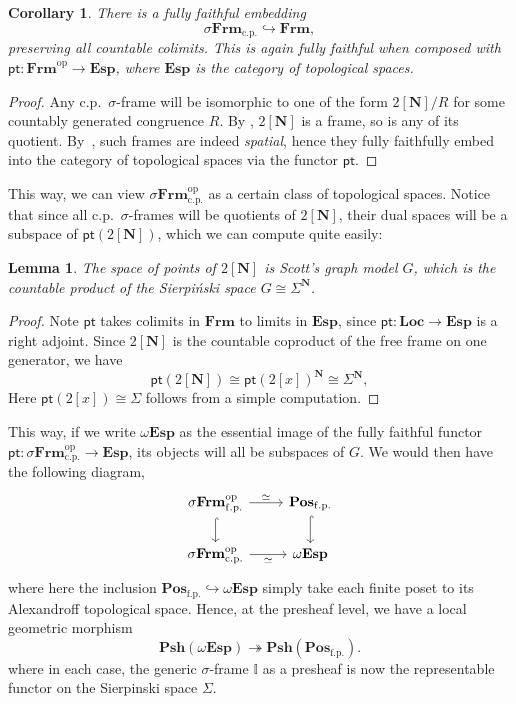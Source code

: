 \documentclass[a4paper,12pt]{amsart}
\newtheorem{lemma}[theorem]{Lemma}
\newtheorem{corollary}[theorem]{Corollary}
\theoremstyle{definition}
\newcommand{\mb}[1]{\mathbf{#1}}
\newcommand{\mbb}[1]{\mathbb{#1}}
\newcommand{\I}{\mbb I}
\newcommand{\mr}[1]{\mathrm{#1}}
\newcommand{\ms}[1]{\mathsf{#1}}
\newcommand{\Pos}{\mb{Pos}}
\newcommand{\psh}{\mb{Psh}}
\newcommand{\op}{^{\mathrm{op}}}
\newcommand{\surj}{\twoheadrightarrow}
\newcommand{\hook}{\hookrightarrow}
\newcommand{\fp}{_{\mr{f.p.}}}
\newcommand{\cp}{_{\mr{c.p.}}}
\newcommand{\N}{\mb N}
\newcommand{\pt}{\ms{pt}}
\newcommand{\sFrm}{\sigma\mb{Frm}}
\newcommand{\Frm}{\mb{Frm}}
\newcommand{\Loc}{\mb{Loc}}
\newcommand{\Topp}{\mb{Esp}}
\newcommand{\wTop}{\omega\mb{Esp}}
\begin{document}

\begin{corollary}\label{cor:dualsframe}
  There is a fully faithful embedding
  \[ \sFrm\cp \hook \Frm, \]
  preserving all countable colimits. This is again fully faithful when composed with $\ms{pt} : \Frm\op \to \Topp$, where $\Topp$ is the category of topological spaces.
\end{corollary}
\begin{proof}
  Any c.p.\ $\sigma$-frame will be isomorphic to one of the form $2[\N]/R$ for some countably generated congruence $R$. By , $2[\N]$ is a frame, so is any of its quotient. By~\cite[Thm. 6.2.4]{makkai2006first}, such frames are indeed \emph{spatial}, hence they fully faithfully embed into the category of topological spaces via the functor $\pt$.
\end{proof}

This way, we can view $\sFrm\cp\op$ as a certain class of topological spaces. Notice that since all c.p.\ $\sigma$-frames will be quotients of $2[\N]$, their dual spaces will be a subspace of $\pt(2[\N])$, which we can compute quite easily:

\begin{lemma}
  The space of points of $2[\N]$ is Scott's graph model $G$, which is the countable product of the Sierpi\'nski space $G \cong \Sigma^\N$.
\end{lemma}
\begin{proof}
  Note $\pt$ takes colimits in $\Frm$ to limits in $\Topp$, since $\pt \colon \Loc \to \Topp$ is a right adjoint. Since $2[\N]$ is the countable coproduct of the free frame on one generator, we have
  \[ \pt(2[\N]) \cong \pt(2[x])^\N \cong \Sigma^\N, \]
  Here $\pt(2[x]) \cong \Sigma$ follows from a simple computation.
\end{proof}

This way, if we write $\wTop$ as the essential image of the fully faithful functor $\pt \colon \sFrm\cp\op \to \Topp$, its objects will all be subspaces of $G$. We would then have the following diagram,
\[
\begin{tikzcd}
  \sFrm\fp\op \ar[d, hook] \ar[r, "\simeq"] & \Pos\fp \ar[d, hook] \\
  \sFrm\cp\op \ar[r, "\simeq"'] & \wTop
\end{tikzcd}
\]
where here the inclusion $\Pos\fp \hook \wTop$ simply take each finite poset to its Alexandroff topological space. Hence, at the presheaf level, we have a local geometric morphism
\[ \psh(\wTop) \surj \psh(\Pos\fp). \]
where in each case, the generic $\sigma$-frame $\I$ as a presheaf is now the representable functor on the Sierpinski space $\Sigma$. 
\end{document}

